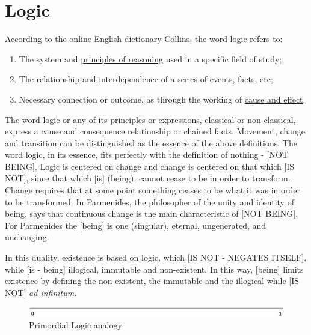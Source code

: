 \section{Logic}
According to the online English dictionary Collins\cite{dic_logic}, the word logic refers to:
	\begin{enumerate}
	   \item The system and \underline{principles of reasoning} used in a specific field of study;
	   \item The \underline{relationship and interdependence of a series} of events, facts, etc; 
	   \item Necessary connection or outcome, as through the working of \underline{cause and effect}. 
	\end{enumerate}
 
\bigbreak
The word logic or any of its principles or expressions, classical or non-classical, express a cause and consequence relationship or chained facts. Movement, change and transition can be distinguished as the essence of the above definitions. The word logic, in its essence, fits perfectly with the definition of nothing - [NOT BEING].  Logic is centered on change and change is centered on that which [IS NOT], since that which [is] (being), cannot cease to be in order to transform. Change requires that at some point something ceases to be what it was in order to be transformed. In  Parmenides, the philosopher of the unity and identity of being, says that continuous change is the main characteristic of [NOT BEING]. For Parmenides the [being] is one (singular), eternal, ungenerated, and unchanging.

In this duality, existence is based on logic, which [IS NOT - NEGATES ITSELF], while [is - being] illogical, immutable and non-existent. In this way, [being] limits existence by defining the non-existent, the immutable and the illogical while [IS NOT] \textit{ad infinitum}.
	\begin{figure}[H]
	\caption{Primordial Logic analogy}
	\label{fig:primordial_logic_representation}
	\centering
	\includegraphics[scale=.9]{sections/images/primordial_logic_representation.jpg}
	\end{figure}

